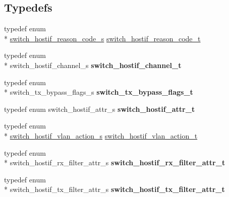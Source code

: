 \subsection*{Typedefs}
\begin{DoxyCompactItemize}
\item 
typedef enum \\*
\hyperlink{group__HostInterface_ga4a81fc4f5f8643f528b3a45009b5ba84}{switch\+\_\+hostif\+\_\+reason\+\_\+code\+\_\+s} \hyperlink{group__HostInterface_gab8b13524888d4f506357fae04c44babc}{switch\+\_\+hostif\+\_\+reason\+\_\+code\+\_\+t}
\item 
\hypertarget{group__HostInterface_gac4de3c3cd6950e8a1b2b7f899b366ba1}{typedef enum \\*
switch\+\_\+hostif\+\_\+channel\+\_\+s {\bfseries switch\+\_\+hostif\+\_\+channel\+\_\+t}}\label{group__HostInterface_gac4de3c3cd6950e8a1b2b7f899b366ba1}

\item 
\hypertarget{group__HostInterface_gaf100302a896240b145824be54a9bc989}{typedef enum \\*
switch\+\_\+tx\+\_\+bypass\+\_\+flags\+\_\+s {\bfseries switch\+\_\+tx\+\_\+bypass\+\_\+flags\+\_\+t}}\label{group__HostInterface_gaf100302a896240b145824be54a9bc989}

\item 
\hypertarget{group__HostInterface_ga54d2584981997b9745518cf88eb6e62a}{typedef enum switch\+\_\+hostif\+\_\+attr\+\_\+s {\bfseries switch\+\_\+hostif\+\_\+attr\+\_\+t}}\label{group__HostInterface_ga54d2584981997b9745518cf88eb6e62a}

\item 
typedef enum \\*
\hyperlink{group__HostInterface_ga0986f09d2454602d51b3051c139a2f6f}{switch\+\_\+hostif\+\_\+vlan\+\_\+action\+\_\+s} \hyperlink{group__HostInterface_ga941337bc8e6d3df44983db93d6000a15}{switch\+\_\+hostif\+\_\+vlan\+\_\+action\+\_\+t}
\item 
\hypertarget{group__HostInterface_ga1752e7273ac657ed3d8169ba90248cca}{typedef enum \\*
switch\+\_\+hostif\+\_\+rx\+\_\+filter\+\_\+attr\+\_\+s {\bfseries switch\+\_\+hostif\+\_\+rx\+\_\+filter\+\_\+attr\+\_\+t}}\label{group__HostInterface_ga1752e7273ac657ed3d8169ba90248cca}

\item 
\hypertarget{group__HostInterface_ga493455f9a9cf3278c0f407e236545d66}{typedef enum \\*
switch\+\_\+hostif\+\_\+tx\+\_\+filter\+\_\+attr\+\_\+s {\bfseries switch\+\_\+hostif\+\_\+tx\+\_\+filter\+\_\+attr\+\_\+t}}\label{group__HostInterface_ga493455f9a9cf3278c0f407e236545d66}


\end{DoxyCompactItemize}
